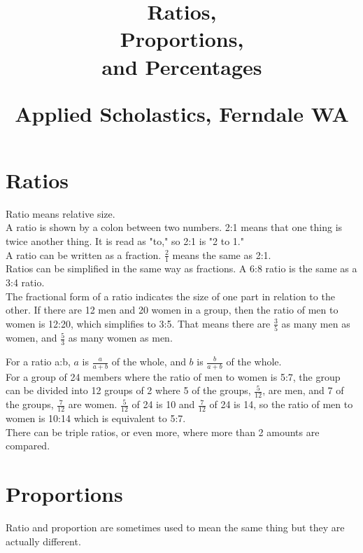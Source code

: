 \documentclass{article}
\author{}
\date{}
\title{Ratios,\\Proportions,\\and Percentages\\
\vspace{28pt}
\begin{normalsize}Applied Scholastics, Ferndale WA \end{normalsize}}
\begin{document}
\maketitle
\pagebreak
\begin{spacing}{1.25}

\section*{Ratios}
Ratio means relative size.\\

A ratio is shown by a colon between two numbers. 2:1 means that one thing is twice another thing. It is read as "to," so 2:1 is "2 to 1."\\

A ratio can be written as a fraction. $\frac{2}{1}$ means the same as 2:1.\\

Ratios can be simplified in the same way as fractions. A 6:8 ratio is the same as a 3:4 ratio.\\

The fractional form of a ratio indicates the size of one part in relation to the other. If there are 12 men and 20 women in a group, then the ratio of men to women is 12:20, which simplifies to 3:5. That means there are $\frac{3}{5}$ as many men as women, and $\frac{5}{3}$ as many women as men.\\

\newpage

For a ratio a:b, $a$ is $\frac{a}{a+b}$ of the whole, and $b$ is $\frac{b}{a+b}$ of the whole.\\

For a group of 24 members where the ratio of men to women is 5:7, the group can be divided into 12 groups of 2 where 5 of the groups, $\frac{5}{12}$, are men, and 7 of the groups, $\frac{7}{12}$ are women. $\frac{5}{12}$ of 24 is 10 and $\frac{7}{12}$ of 24 is 14, so the ratio of men to women is 10:14 which is equivalent to 5:7.\\

There can be triple ratios, or even more, where more than 2 amounts are compared.\\

\section*{Proportions}
Ratio and proportion are sometimes used to mean the same thing but they are actually different.\\


\end{spacing}
\end{document}
